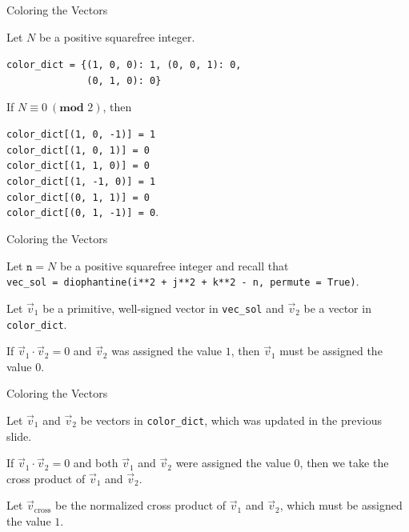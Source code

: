 \documentclass[11pt]{beamer}
\begin{document}
\begin{frame}{Coloring the Vectors}

Let $N$ be a positive squarefree integer.

\pause

\texttt{color\_dict = \{(1, 0, 0): 1, (0, 0, 1): 0,} \\
\texttt{\ \ \ \ \ \ \ \ \ \ \ \ \ \ (0, 1, 0): 0\}}

\pause

If $N \equiv 0 \ (\textbf{mod } 2)$, then

\texttt{color\_dict[(1, 0, -1)] = 1} \\
\texttt{color\_dict[(1, 0, 1)] = 0} \\
\texttt{color\_dict[(1, 1, 0)] = 0} \\
\texttt{color\_dict[(1, -1, 0)] = 1} \\
\texttt{color\_dict[(0, 1, 1)] = 0} \\
\texttt{color\_dict[(0, 1, -1)] = 0}. \\

\end{frame}
\begin{frame}{Coloring the Vectors}

Let $\texttt{n} = N$ be a positive squarefree integer and recall that \\
\texttt{vec\_sol = diophantine(i**2 + j**2 + k**2 - n, permute = True)}.

\pause

Let $\vec{v}_{1}$ be a primitive, well-signed vector in \texttt{vec\_sol} and $\vec{v}_{2}$ be a vector in \texttt{color\_dict}.

\pause

If $\vec{v}_{1} \cdot \vec{v}_{2} = 0$ and $\vec{v}_{2}$ was assigned the value $1$, then $\vec{v}_{1}$ must be assigned the value $0$.

\end{frame}
\begin{frame}{Coloring the Vectors}


Let $\vec{v}_{1}$ and $\vec{v}_{2}$ be vectors in \texttt{color\_dict}, which was updated in the previous slide.

\pause

If $\vec{v}_{1} \cdot \vec{v}_{2} = 0$ and both $\vec{v}_{1}$ and $\vec{v}_{2}$ were assigned the value $0$, then we take the cross product of $\vec{v}_{1}$ and $\vec{v}_{2}$.

\pause

Let $\vec{v}_{\text{cross}}$ be the normalized cross product of $\vec{v}_{1}$ and $\vec{v}_{2}$, which must be assigned the value $1$.

\end{frame}
\end{document}
